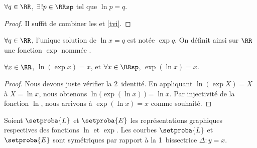 \begin{fact}
	$\forall q \in \RR$,
	$\exists\kern1pt! p \in \RRsp$ tel que 
	$\ln p = q$.
\end{fact}


\begin{proof}
	Il suffit de combiner les  et \ref{tvi}.
\end{proof}




\begin{defi}
	$\forall q \in \RR$, 
	l'unique solution de $\ln x = q$ est notée $\exp q$.
	On définit ainsi sur $\RR$ une fonction $\exp$ nommée .
\end{defi}




\begin{fact}
	$\forall x \in \RR$, $\ln ( \exp x ) = x$,
	et
	$\forall x \in \RRsp$, $\exp ( \ln x ) = x$.
\end{fact}


\begin{proof}	
	Nous devons juste vérifier la 2\ieme\ identité.
	En appliquant $\ln ( \exp X ) = X$ à $X = \ln x$,
	nous obtenons $\ln \big( \exp ( \ln x ) \,\big) = \ln x$.
	Par injectivité de la fonction $\ln$, nous arrivons à $\exp ( \ln x ) = x$ comme souhaité.
\end{proof}




\begin{fact} \label{exp-sym-ln}
	Soient $\setproba{L}$ et $\setproba{E}$ les représentations graphiques respectives des fonctions $\ln$ et $\exp$.
	Les courbes $\setproba{L}$ et $\setproba{E}$ sont symétriques par rapport à la 1\iere\ bissectrice $\Delta: y = x$.
\end{fact}


